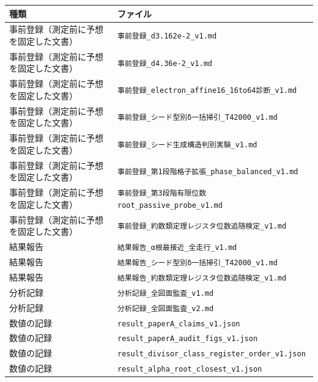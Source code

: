 \documentclass[
]{ltjsarticle}
\newcounter{none} %
\begin{document}
{\def\LTcaptype{none} %
\begin{longtable}[]{@{}
  >{\raggedright\arraybackslash}p{}
  >{\raggedright\arraybackslash}p{}@{}}
\toprule\noalign{}
\begin{minipage}[b]{\linewidth}\raggedright
種類
\end{minipage} & \begin{minipage}[b]{\linewidth}\raggedright
ファイル
\end{minipage} \\
\midrule\noalign{}
\endhead
\bottomrule\noalign{}
\endlastfoot
事前登録（測定前に予想を固定した文書） &
\texttt{事前登録\_d3.162e-2\_v1.md} \\
事前登録（測定前に予想を固定した文書） &
\texttt{事前登録\_d4.36e-2\_v1.md} \\
事前登録（測定前に予想を固定した文書） &
\texttt{事前登録\_electron\_affine16\_16to64診断\_v1.md} \\
事前登録（測定前に予想を固定した文書） &
\texttt{事前登録\_シード型別δ一括掃引\_T42000\_v1.md} \\
事前登録（測定前に予想を固定した文書） &
\texttt{事前登録\_シード生成構造判別実験\_v1.md} \\
事前登録（測定前に予想を固定した文書） &
\texttt{事前登録\_第1段階格子拡張\_phase\_balanced\_v1.md} \\
事前登録（測定前に予想を固定した文書） &
\texttt{事前登録\_第3段階有限位数root\_passive\_probe\_v1.md} \\
事前登録（測定前に予想を固定した文書） &
\texttt{事前登録\_約数類定理レジスタ位数追随検定\_v1.md} \\
結果報告 & \texttt{結果報告\_α根最接近\_全走行\_v1.md} \\
結果報告 & \texttt{結果報告\_シード型別δ一括掃引\_T42000\_v1.md} \\
結果報告 & \texttt{結果報告\_約数類定理レジスタ位数追随検定\_v1.md} \\
分析記録 & \texttt{分析記録\_全図面監査\_v1.md} \\
分析記録 & \texttt{分析記録\_全図面監査\_v2.md} \\
数値の記録 & \texttt{result\_paperA\_claims\_v1.json} \\
数値の記録 & \texttt{result\_paperA\_audit\_figs\_v1.json} \\
数値の記録 &
\texttt{result\_divisor\_class\_register\_order\_v1.json} \\
数値の記録 & \texttt{result\_alpha\_root\_closest\_v1.json} \\
\end{longtable}
}
\end{document}
